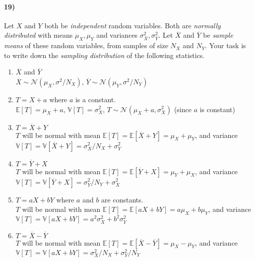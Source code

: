 \documentclass[12pt]{article}
\newcommand\ov{\overline}
\newcommand\BB{\mathbb}
\newcommand\EE{\mathbb{E}}
\newcommand\mc{\mathcal}
\numberwithin{equation}{section}
\numberwithin{figure}{section}
\numberwithin{table}{section}
\begin{document}
\paragraph{19)} Let $X$ and $Y$ both be \emph{independent} random variables. Both are \emph{normally distributed} with means $\mu_X,\mu_Y$ and variances $\sigma^2_X,\sigma^2_Y$. Let $\ov{X}$ and $\ov{Y}$ be \emph{sample means} of these random variables, from samples of size $N_X$ and $N_Y$. Your task is to write down the \emph{sampling distribution} of the following statistics.
\begin{enumerate}
\item $\ov{X}$ and $\ov{Y}$ \\
{\color{blue} $\ov{X}\sim\mc{N}(\mu_X,\sigma^2/N_X)$, $\ov{Y}\sim\mc{N}(\mu_Y,\sigma^2/N_Y)$}
\item $T=X+a$ where $a$ is a constant. \\
{\color{blue} $\EE[T]=\mu_X+a$, $\BB{V}[T] = \sigma^2_X$, $T\sim\mc{N}(\mu_X+a,\sigma^2_X)$ (since $a$ is constant)}
\item $T=\ov{X}+Y$ \\
{\color{blue} $T$ will be normal with mean $\EE[T]=\EE[\ov{X}+Y] = \mu_X+\mu_Y$, and variance $\BB{V}[T]=\BB{V}[\ov{X}+Y] = \sigma^2_X/N_X + \sigma^2_Y$}
\item $T=\ov{Y}+X$ \\
{\color{blue} $T$ will be normal with mean $\EE[T]=\EE[\ov{Y}+X] = \mu_Y+\mu_X$, and variance $\BB{V}[T]=\BB{V}[\ov{Y}+X] = \sigma^2_Y/N_Y + \sigma^2_X$}
\item $T=aX + bY$ where $a$ and $b$ are constants. \\
{\color{blue} $T$ will be normal with mean $\EE[T]=\EE[aX+bY] = a\mu_X+b\mu_Y$, and variance $\BB{V}[T]=\BB{V}[aX+bY] = a^2\sigma^2_X + b^2\sigma^2_Y$}
\item $T=\ov{X}-\ov{Y}$ \\
{\color{blue} $T$ will be normal with mean $\EE[T]=\EE[\ov{X}-\ov{Y}] = \mu_X-\mu_Y$, and variance $\BB{V}[T]=\BB{V}[aX+bY] = \sigma^2_X/N_X + \sigma^2_Y/N_Y$}
\end{enumerate}
\end{document}
